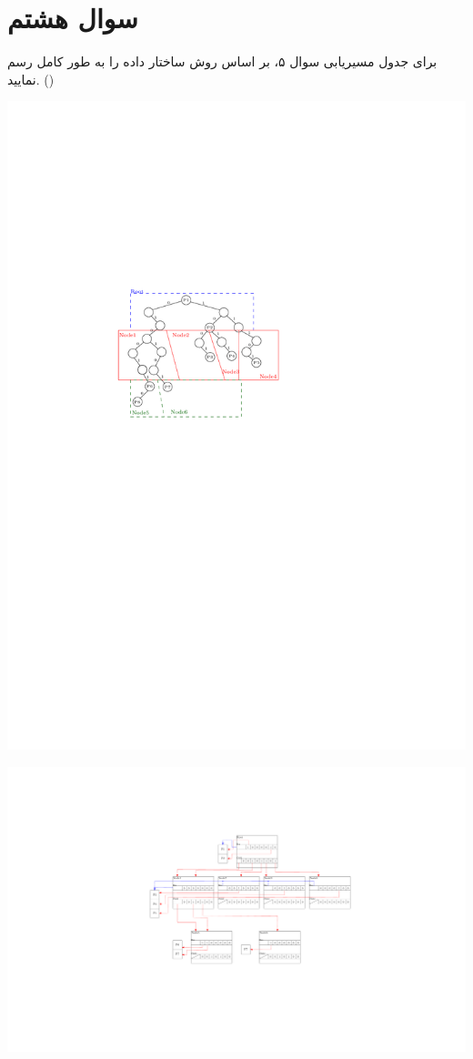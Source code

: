 \section{سوال هشتم}

برای جدول مسیریابی سوال ۵، بر اساس روش  ساختار داده را به طور کامل رسم نمایید. ()


\begin{qsolve}
	\begin{center}
		\includegraphics*[width=0.6\linewidth]{pics/q8a.pdf}
	\end{center}
	
	
	\begin{center}
		\includegraphics*[width=1\linewidth]{pics/q8b.pdf}
	\end{center}
	
\end{qsolve}